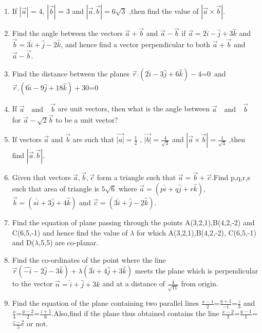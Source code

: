 \begin{enumerate}
	\item If $|\overrightarrow{a}|$ = 4, $|\overrightarrow{b}|$ = 3 and
	      $|\overrightarrow{a}.\overrightarrow{b}|  = 6\sqrt{3}$ ,then  find  the  value  of  $|\overrightarrow{a}\times \overrightarrow{b}|.$
	\item Find the angle between the vectors $\vec{a}+\vec{b}$ and $\vec{a}-\vec{b}$ if $\vec{a} = 2\hat{i}-\hat{j}+3\hat{k}$ and $\vec{b} = 3\hat{i}+\hat{j}-2\hat{k}$, and hence find a vector perpendicular to both $\vec{a}+\vec{b}$ and $\vec{a}-\vec{b}$.
	\item Find the distance between the planes $\vec{r}.(2\hat{i}-3\hat{j}+6\hat{k})-4$=0\
	      {and} $ \vec{r}.(6\hat{i}-9\hat{j}+18\hat{k})+30$=0\\
	\item If $\Vec{a} \quad \text{and}\quad \vec{b} $ are unit vectors, then what is the angle between $\Vec{a} \quad \text{and}\quad \vec{b} $ for $\vec{a}-\sqrt{2}\vec{b}$ to be a unit vector?\\
	\item If vectors $\vec{a}$ {and} $\vec{b}$ are such that $\vec{|a|}= \frac{1}{2}$ ,  $\vec{|b|}= \frac{4}{\sqrt{3}}$ and $|\vec{a} \times \vec{b}|=\frac{1}{\sqrt{3}}$ ,then find $|\vec{a}.\vec{b}|$.\\
	\item Given that vectors $\overrightarrow{a},\overrightarrow{b},\overrightarrow{c}$ form a triangle such that $\overrightarrow{a}=\overrightarrow{b}+\overrightarrow{c}$.Find p,q,r,s such that area of triangle is $5\sqrt{6}$ where $\overrightarrow{a}=(p\hat{i}+q\hat{j}+r\hat{k})$, $\overrightarrow{b}=(s\hat{i}+3\hat{j}+4\hat{k})$ and $\overrightarrow{c}=(3\hat{i}+\hat{j}-2\hat{k})$.\\
	\item Find the equation of plane passing through the points A(3,2,1),B(4,2,-2) and C(6,5,-1) and hence find the value of $\lambda$ for which A(3,2,1),B(4,2,-2), C(6,5,-1) and D($\lambda$,5,5) are co-planar.
	\item Find the co-ordinates of the point where the line $\overrightarrow{r}(\hat{-i}-2\hat{j}-3\hat{k})+\lambda(3\hat{i}+4\hat{j}+3
		      \hat{k})$ meets the plane which is perpendicular to the vector $\overrightarrow{n}=\hat{i}+\hat{j}+3\hat{k}$ and at a distance of $\frac{4}{\sqrt{11}}$ from origin.
	\item Find the equation of the plane containing two parallel lines $\frac{x-1}{2}$=$\frac{y+1}{-1}$=$\frac{z}{3}$ and $\frac{x}{4}$=$\frac{y-2}{2}$=$\frac{z+1}{6}$.Also,find if the plane thus obtained contains the line $\frac{x-2}{3}$=$\frac{y-1}{1}$=$\frac{z-2}{5}$ or not.\\


\end{enumerate}
